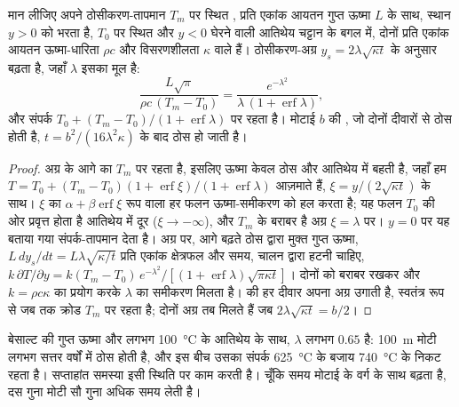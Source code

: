 \begin{proposition}[अंतर्वेधन का ठोसीकरण]\label{prop:b2:magma-emplacement:stefan}
मान लीजिए अपने ठोसीकरण-तापमान $T_m$ पर स्थित , प्रति एकांक आयतन गुप्त ऊष्मा $L$ के साथ,
स्थान $y > 0$ को भरता है, $T_0$ पर स्थित और $y < 0$ घेरने वाली आतिथेय चट्टान के बगल में, दोनों
प्रति एकांक आयतन ऊष्मा-धारिता $\rho c$ और विसरणशीलता $\kappa$ वाले हैं।
ठोसीकरण-अग्र $y_s = 2\lambda\sqrt{\kappa t}$ के अनुसार बढ़ता है, जहाँ $\lambda$
इसका मूल है:
\[
\frac{L\sqrt\pi}{\rho c\,(T_m - T_0)} = \frac{e^{-\lambda^2}}{\lambda\,(1 + \operatorname{erf}\lambda)},
\]
और संपर्क $T_0 + (T_m - T_0)/(1 + \operatorname{erf}\lambda)$ पर रहता है। मोटाई $b$
की , जो दोनों दीवारों से ठोस होती है,
$t = b^2/(16\lambda^2\kappa)$ के बाद ठोस हो जाती है।
\end{proposition}

\begin{proof}
अग्र के आगे का  $T_m$ पर रहता है, इसलिए ऊष्मा केवल ठोस
और आतिथेय में बहती है, जहाँ हम $T = T_0 + (T_m - T_0)(1 + \operatorname{erf}\xi)/(1 +
\operatorname{erf}\lambda)$ आज़माते हैं, $\xi = y/(2\sqrt{\kappa t})$ के साथ। $\xi$ का
$\alpha + \beta\operatorname{erf}\xi$ रूप वाला हर फलन ऊष्मा-समीकरण को हल करता है; यह फलन
$T_0$ की ओर प्रवृत्त होता है आतिथेय में दूर ($\xi \to -\infty$), और $T_m$ के बराबर है
अग्र $\xi = \lambda$ पर। $y = 0$ पर यह बताया गया संपर्क-तापमान देता है। अग्र पर,
आगे बढ़ते ठोस द्वारा मुक्त गुप्त ऊष्मा, $L\,dy_s/dt = L\lambda\sqrt{\kappa/t}$
प्रति एकांक क्षेत्रफल और समय, चालन द्वारा हटनी चाहिए, $k\,\partial T/\partial y = k(T_m -
T_0)\,e^{-\lambda^2}/[(1 + \operatorname{erf}\lambda)\sqrt{\pi\kappa t}]$। दोनों को बराबर रखकर
और $k = \rho c\kappa$ का प्रयोग करके $\lambda$ का समीकरण मिलता है।
 की हर दीवार अपना अग्र उगाती है, स्वतंत्र रूप से जब तक क्रोड $T_m$ पर रहता है; दोनों
अग्र तब मिलते हैं जब $2\lambda\sqrt{\kappa t} = b/2$।
\end{proof}

बेसाल्ट की गुप्त ऊष्मा और लगभग \qty{100}{\celsius} के आतिथेय के साथ,
$\lambda$ लगभग $0.65$ है: \qty{100}{m} मोटी  लगभग
सत्तर वर्षों में ठोस होती है, और इस बीच उसका संपर्क \qty{625}{\celsius} के बजाय
\qty{740}{\celsius} के निकट रहता है। सप्ताहांत समस्या इसी स्थिति पर काम करती है।
चूँकि समय मोटाई के वर्ग के साथ बढ़ता है, दस गुना मोटी 
सौ गुना अधिक समय लेती है।

